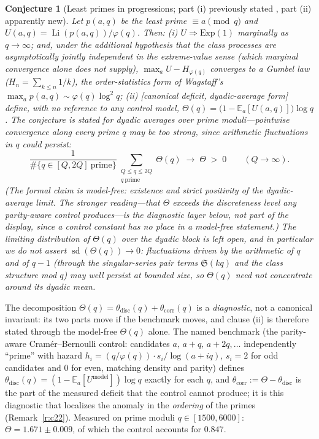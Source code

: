 \documentclass[11pt]{article}
\newtheorem{conjecture}{Conjecture}
\theoremstyle{definition}
\newcommand{\Li}{\operatorname{Li}}
\newcommand{\SG}{\mathfrak S}
\begin{document}
\setcounter{conjecture}{2}%
\begin{conjecture}[Least primes in progressions; part (i) previously
stated \cite{HLS,Wagstaff,Fiori,Leung}, part (ii) apparently
new]\label{c22}
Let $p(a,q)$ be the least prime $\equiv a\pmod q$ and
$U(a,q)=\Li(p(a,q))/\varphi(q)$.  Then:
\emph{(i)} $U\Rightarrow\mathrm{Exp}(1)$ marginally as $q\to\infty$;
and, under the additional hypothesis that the class processes are
asymptotically jointly independent in the extreme-value sense (which
marginal convergence alone does not supply),
$\max_a U-H_{\varphi(q)}$ converges to a Gumbel law
($H_n=\sum_{k\le n}1/k$), the order-statistics form of Wagstaff's
$\max_a p(a,q)\sim\varphi(q)\log^2q$;
\emph{(ii)} [canonical deficit, dyadic-average form] define, with no
reference to any control model,
$\Theta(q)=\bigl(1-\mathbb E_a[U(a,q)]\bigr)\log q$.  The conjecture
is stated for dyadic averages over prime moduli---pointwise
convergence along every prime $q$ may be too strong, since
arithmetic fluctuations in $q$ could persist:
\[
\frac1{\#\{q\in[Q,2Q]\ \text{prime}\}}
\sum_{\substack{Q\le q\le2Q\\ q\ \mathrm{prime}}}\Theta(q)
\;\longrightarrow\;\Theta\;>\;0
\qquad(Q\to\infty).
\]
(The formal claim is model-free: existence and strict
positivity of the dyadic-average limit.  The stronger reading---that
$\Theta$ exceeds the discreteness level any parity-aware control
produces---is the diagnostic layer below, not part of the display,
since a control constant has no place in a model-free statement.)
The limiting \emph{distribution} of $\Theta(q)$ over the dyadic
block is left open, and in particular we do \emph{not} assert
$\operatorname{sd}(\Theta(q))\to0$: fluctuations driven by the
arithmetic of $q$ and of $q-1$ (through the singular-series pair
terms $\SG(kq)$ and the class structure mod $q$) may well persist at
bounded size, so $\Theta(q)$ need not concentrate around its
dyadic mean.
\end{conjecture}

The decomposition
$\Theta(q)=\theta_{\mathrm{disc}}(q)+\theta_{\mathrm{corr}}(q)$ is a
\emph{diagnostic}, not a canonical invariant: its two parts move if
the benchmark moves, and clause (ii) is therefore stated through the
model-free $\Theta(q)$ alone.  The named benchmark (the parity-aware
Cram\'er--Bernoulli
control: candidates $a,\,a+q,\,a+2q,\dots$ independently ``prime''
with hazard $h_i=(q/\varphi(q))\cdot s_i/\log(a+iq)$, $s_i=2$ for odd
candidates and $0$ for even, matching density and parity) defines
$\theta_{\mathrm{disc}}(q)=(1-\mathbb E_a[U^{\mathrm{model}}])\log q$
exactly for each $q$, and
$\theta_{\mathrm{corr}}:=\Theta-\theta_{\mathrm{disc}}$ is the part
of the measured deficit that the control cannot produce; it is this
diagnostic that localizes the anomaly in the \emph{ordering} of the
primes (Remark~\ref{r:c22}).  Measured on prime moduli
$q\in[1500,6000]$: $\Theta=1.671\pm0.009$, of which the control
accounts for $0.847$.
\end{document}
